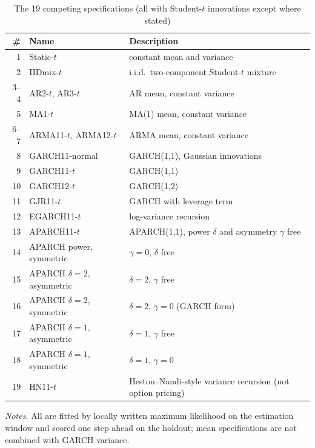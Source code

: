 \documentclass[11pt,a4paper]{article}
\theoremstyle{plain}
\theoremstyle{remark}
\begin{document}
\begin{table}[ht]
\centering\small
\caption{The 19 competing specifications (all with Student-$t$ innovations except where stated)}\label{tab:specs}
\begin{tabular}{rll}
\toprule
\# & Name & Description\\
\midrule
1 & Static-$t$ & constant mean and variance\\
2 & IIDmix-$t$ & i.i.d.\ two-component Student-$t$ mixture\\
3--4 & AR2-$t$, AR3-$t$ & AR mean, constant variance\\
5 & MA1-$t$ & MA(1) mean, constant variance\\
6--7 & ARMA11-$t$, ARMA12-$t$ & ARMA mean, constant variance\\
8 & GARCH11-normal & GARCH(1,1), Gaussian innovations\\
9 & GARCH11-$t$ & GARCH(1,1)\\
10 & GARCH12-$t$ & GARCH(1,2)\\
11 & GJR11-$t$ & GARCH with leverage term\\
12 & EGARCH11-$t$ & log-variance recursion\\
13 & APARCH11-$t$ & APARCH(1,1), power $\delta$ and asymmetry $\gamma$ free\\
14 & APARCH power, symmetric & $\gamma=0$, $\delta$ free\\
15 & APARCH $\delta{=}2$, asymmetric & $\delta=2$, $\gamma$ free\\
16 & APARCH $\delta{=}2$, symmetric & $\delta=2$, $\gamma=0$ (GARCH form)\\
17 & APARCH $\delta{=}1$, asymmetric & $\delta=1$, $\gamma$ free\\
18 & APARCH $\delta{=}1$, symmetric & $\delta=1$, $\gamma=0$\\
19 & HN11-$t$ & Heston--Nandi-style variance recursion (not option pricing)\\
\bottomrule
\end{tabular}
\par\smallskip\footnotesize\emph{Notes.} All are fitted by locally written maximum likelihood on the estimation window and scored one step ahead on the holdout; mean specifications are not combined with GARCH variance.
\end{table}
\end{document}
